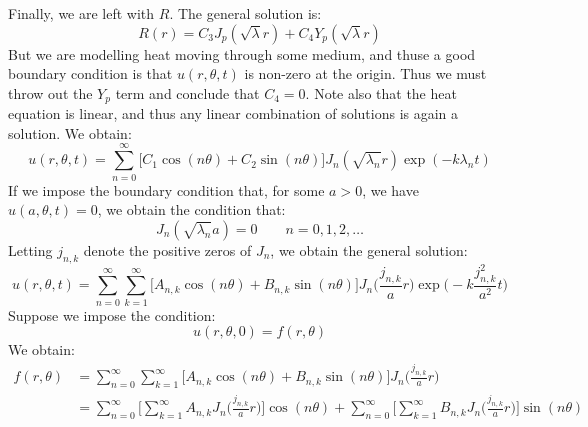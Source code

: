             Finally, we are left with $R$. The general solution is:
            \begin{equation}
                R(r)=C_{3}J_{p}(\sqrt{\lambda}r)+
                C_{4}Y_{p}(\sqrt{\lambda}r)
            \end{equation}
            But we are modelling heat moving through some medium,
            and thuse a good boundary condition is that
            $u(r,\theta,t)$ is non-zero at the origin. Thus we
            must throw out the $Y_{p}$ term and conclude that
            $C_{4}=0$. Note also that the heat equation is linear,
            and thus any linear combination of solutions is again
            a solution. We obtain:
            \begin{equation}
                u(r,\theta,t)=\sum_{n=0}^{\infty}
                \big[C_{1}\cos(n\theta)+C_{2}\sin(n\theta)\big]
                J_{n}(\sqrt{\lambda_{n}}r)
                \exp(\minus{k}\lambda_{n}{t})
            \end{equation}
            If we impose the boundary condition that, for some
            $a>0$, we have $u(a,\theta,t)=0$, we obtain the
            condition that:
            \begin{equation}
                J_{n}(\sqrt{\lambda_{n}}a)=0
                \quad\quad
                n=0,1,2,\dots
            \end{equation}
            Letting $j_{n,k}$ denote the positive zeros of
            $J_{n}$, we obtain the general solution:
            \begin{equation}
                u(r,\theta,t)=
                \sum_{n=0}^{\infty}\sum_{k=1}^{\infty}
                    \big[A_{n,k}\cos(n\theta)+B_{n,k}\sin(n\theta)
                    \big]J_{n}\Big(\frac{j_{n,k}}{a}r\Big)
                    \exp\Big(\minus{k}\frac{j_{n,k}^{2}}{a^{2}}t\Big)
            \end{equation}
            Suppose we impose the condition:
            \begin{equation}
                u(r,\theta,0)=f(r,\theta)
            \end{equation}
            We obtain:
            \begin{subequations}
                \begin{align}
                    f(r,\theta)&=
                    \sum_{n=0}^{\infty}\sum_{k=1}^{\infty}
                    \big[A_{n,k}\cos(n\theta)+B_{n,k}\sin(n\theta)
                    \big]J_{n}\Big(\frac{j_{n,k}}{a}r\Big)\\
                    &=\sum_{n=0}^{\infty}\Big[\sum_{k=1}^{\infty}
                    A_{n,k}J_{n}\big(\frac{j_{n,k}}{a}r\big)\Big]
                    \cos(n\theta)+
                    \sum_{n=0}^{\infty}\Big[\sum_{k=1}^{\infty}
                    B_{n,k}J_{n}\big(\frac{j_{n,k}}{a}r\big)\Big]
                    \sin(n\theta)
                \end{align}
            \end{subequations}
